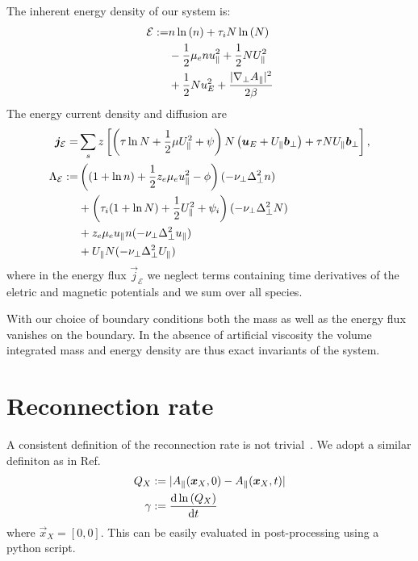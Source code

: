 The inherent energy density of our system is:
\begin{align}
 \mathcal{E} := &
                    n  \ln{(\ensuremath{n })}
                  + \tau_i N \ln{( \ensuremath{N})}
                  \nonumber \\
                 &- \frac{1}{2} \mu_e n  u_\parallel^2
                  + \frac{1}{2} N U_\parallel^2
                  \nonumber \\
                 &+\frac{1}{2} N u_E^2
                  + \frac{|\nabla_\perp A_\parallel|^2}{2 \beta}
\end{align}
The energy current density and diffusion are
\begin{align}
  {\boldsymbol{j}}_{\mathcal E} =& \sum_s z\left[
  \left(\tau \ln N + \frac{1}{2}\mu U_\parallel^2 + \psi \right)N\left(
  {\boldsymbol{u}}_E +U_\parallel {\boldsymbol{b}}_\perp  \right) + \tau NU_\parallel  {\boldsymbol{b}}_\perp\right]
  , \\
    \Lambda_\mathcal{E} :=  &\left( (1+\ln n ) + \frac{1}{2} z_e \mu_e u_\parallel^2 - \phi \right) (-\nu_\perp \Delta_\perp^2 n )
    \nonumber\\
    &+ \left( \tau_i ( 1+\ln N) + \frac{1}{2} U_\parallel^2 + \psi_i\right)(-\nu_\perp \Delta_\perp^2 N)
    \nonumber\\
    &+ z_e\mu_e u_\parallel n  (-\nu_\perp \Delta_\perp^2 u_\parallel)
    \nonumber\\
    &+ U_\parallel N (-\nu_\perp \Delta_\perp^2 U_\parallel)
\end{align}
where in the energy flux $\vec j_{\mathcal E}$
we neglect terms  containing time derivatives
of the eletric and magnetic potentials and we sum over all species.

With our choice of boundary conditions both the mass as well as the energy flux
vanishes on the boundary. In the absence of artificial viscosity the volume integrated
mass and energy density are thus exact invariants of the system.

\section{Reconnection rate}
 A consistent definition of the reconnection rate is not trivial~\cite{Comisso2016}.
 We adopt a similar definiton as in Ref.~\cite{Comisso2013}
\begin{align}
 Q_X&:=|  A_\parallel({\boldsymbol{x}}_X, 0)-A_\parallel({\boldsymbol{x}}_X,t) | \\
 \gamma&:= \frac{\mathrm{d} \ln{(Q_X)}}{\mathrm{d} t}
\end{align}
where $\vec{x}_X = [0,0]$.
This can be easily evaluated in post-processing using a python script.

